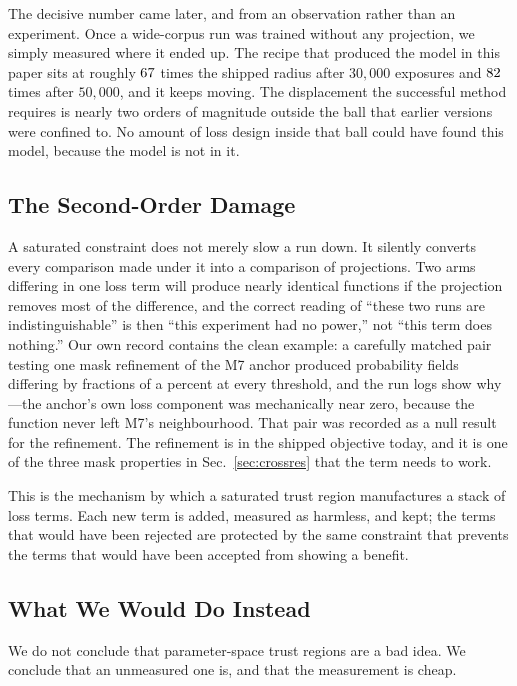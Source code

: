 The decisive number came later, and from an observation rather than an
experiment.
Once a wide-corpus run was trained without any projection, we simply measured
where it ended up.
The recipe that produced the model in this paper sits at roughly
$67$ times the shipped radius after $30{,}000$ exposures and
$82$ times after $50{,}000$, and it keeps moving.
The displacement the successful method requires is nearly two orders of
magnitude outside the ball that earlier versions were confined to.
No amount of loss design inside that ball could have found this model, because
the model is not in it.

\subsection{The Second-Order Damage}

A saturated constraint does not merely slow a run down.
It silently converts every comparison made under it into a comparison of
projections.
Two arms differing in one loss term will produce nearly identical functions if
the projection removes most of the difference, and the correct reading of
``these two runs are indistinguishable'' is then ``this experiment had no
power,'' not ``this term does nothing.''
Our own record contains the clean example: a carefully matched pair testing one
mask refinement of the M7 anchor produced probability fields differing by
fractions of a percent at every threshold, and the run logs show why---the
anchor's own loss component was mechanically near zero, because the function
never left M7's neighbourhood.
That pair was recorded as a null result for the refinement.
The refinement is in the shipped objective today, and it is one of the three
mask properties in Sec.~\ref{sec:crossres} that the term needs to work.

This is the mechanism by which a saturated trust region manufactures a stack of
loss terms.
Each new term is added, measured as harmless, and kept; the terms that would
have been rejected are protected by the same constraint that prevents the terms
that would have been accepted from showing a benefit.

\subsection{What We Would Do Instead}

We do not conclude that parameter-space trust regions are a bad idea.
We conclude that an unmeasured one is, and that the measurement is cheap.

